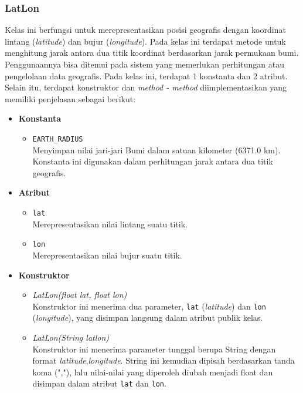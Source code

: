 \subsubsection{LatLon}
\label{subss:latlon}
Kelas ini berfungsi untuk merepresentasikan posisi geografis dengan koordinat lintang (\textit{latitude}) dan bujur (\textit{longitude}). Pada kelas ini terdapat metode untuk menghitung jarak antara dua titik koordinat berdasarkan jarak permukaan bumi. Penggunaannya bisa ditemui pada sistem yang memerlukan perhitungan atau pengelolaan data geografis. Pada kelas ini, terdapat 1 konstanta dan 2 atribut. Selain itu, terdapat konstruktor dan \textit{method - method} diimplementasikan yang memiliki penjelasan sebagai berikut:
\begin{itemize}
    \item \textbf{Konstanta}
    \begin{itemize}
        \item \texttt{EARTH\_RADIUS}
        \\ Menyimpan nilai jari-jari Bumi dalam satuan kilometer (6371.0 km). Konstanta ini digunakan dalam perhitungan jarak antara dua titik geografis.
    \end{itemize}
    
    \item \textbf{Atribut}
    \begin{itemize}
        \item \texttt{lat}
        \\ Merepresentasikan nilai lintang suatu titik.
        \item \texttt{lon}
        \\ Merepresentasikan nilai bujur suatu titik.
    \end{itemize}

    \item \textbf{Konstruktor}
    \begin{itemize}
        \item \textit{LatLon(float lat, float lon)}
        \\ Konstruktor ini menerima dua parameter, \texttt{lat} (\textit{latitude}) dan \texttt{lon} (\textit{longitude}), yang disimpan langsung dalam atribut publik kelas.
        \item \textit{LatLon(String latlon)}
        \\ Konstruktor ini menerima parameter tunggal berupa String dengan format \textit{latitude},\textit{longitude}. String ini kemudian dipisah berdasarkan tanda koma (","), lalu nilai-nilai yang diperoleh diubah menjadi float dan disimpan dalam atribut \texttt{lat} dan \texttt{lon}.
    \end{itemize}


\end{itemize}
